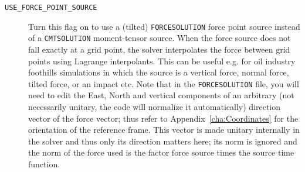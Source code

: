 \vspace{1cm}
\begin{description}
\item [{\texttt{USE\_FORCE\_POINT\_SOURCE}}] Turn this flag on to use a
(tilted) \texttt{FORCESOLUTION} force point source instead of a \texttt{CMTSOLUTION}
moment-tensor source. When the force source does not fall exactly
at a grid point, the solver interpolates the force between grid points
using Lagrange interpolants. This can be useful e.g. for oil industry
foothills simulations in which the source is a vertical force, normal
force, tilted force, or an impact etc. Note that in the \texttt{FORCESOLUTION}
file, you will need to edit the East, North and vertical components
of an arbitrary (not necessarily unitary, the code will normalize it automatically) direction vector of the force vector;
thus refer to Appendix~\ref{cha:Coordinates} for the orientation
of the reference frame. This vector is made unitary internally in
the solver and thus only its direction matters here; its norm is ignored
and the norm of the force used is the factor force source times the
source time function.


\end{description}
